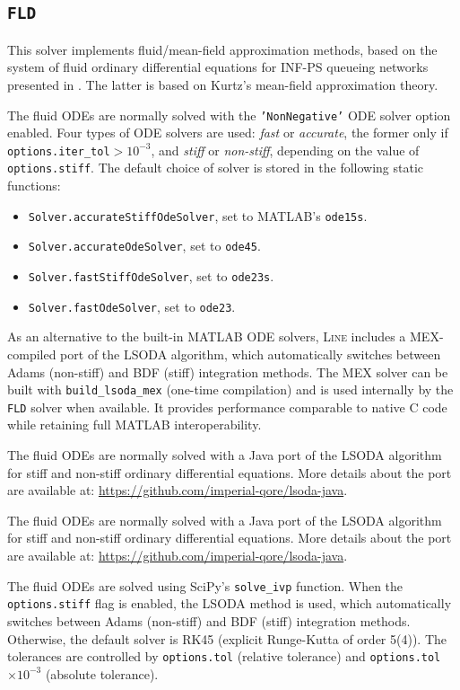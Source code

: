\subsection{\texttt{FLD}}
This solver implements fluid/mean-field approximation methods, based on the system of fluid ordinary differential equations for INF-PS queueing networks presented in \cite{PerC17}. The latter is based on Kurtz's mean-field approximation theory.
\begin{MATLAB}
The fluid ODEs are normally solved with the \texttt{'NonNegative'} ODE solver option enabled. Four types of ODE solvers are used: \emph{fast} or \emph{accurate}, the former only if \texttt{options.iter\_tol}$> 10^{-3}$, and \emph{stiff} or \emph{non-stiff}, depending on the value of \texttt{options.stiff}. The default choice of solver is stored in the following static functions:
\begin{itemize}
\item \texttt{Solver.accurateStiffOdeSolver}, set to MATLAB's \texttt{ode15s}.
\item \texttt{Solver.accurateOdeSolver}, set to \texttt{ode45}.
\item \texttt{Solver.fastStiffOdeSolver}, set to \texttt{ode23s}.
\item \texttt{Solver.fastOdeSolver}, set to \texttt{ode23}.
\end{itemize}
As an alternative to the built-in MATLAB ODE solvers, \textsc{Line} includes a MEX-compiled port of the LSODA algorithm, which automatically switches between Adams (non-stiff) and BDF (stiff) integration methods.  The MEX solver can be built with \texttt{build\_lsoda\_mex} (one-time compilation) and is used internally by the \texttt{FLD} solver when available.  It provides performance comparable to native C code while retaining full MATLAB interoperability.
\end{MATLAB}
\begin{JAVA}
The fluid ODEs are normally solved with a Java port of the LSODA algorithm for stiff and non-stiff ordinary differential equations. More details about the port are available at: \url{https://github.com/imperial-qore/lsoda-java}.
\end{JAVA}
\begin{KOTLIN}
The fluid ODEs are normally solved with a Java port of the LSODA algorithm for stiff and non-stiff ordinary differential equations. More details about the port are available at: \url{https://github.com/imperial-qore/lsoda-java}.
\end{KOTLIN}
\begin{PYTHON}
The fluid ODEs are solved using SciPy's \texttt{solve\_ivp} function. When the \texttt{options.stiff} flag is enabled, the LSODA method is used, which automatically switches between Adams (non-stiff) and BDF (stiff) integration methods. Otherwise, the default solver is RK45 (explicit Runge-Kutta of order 5(4)). The tolerances are controlled by \texttt{options.tol} (relative tolerance) and \texttt{options.tol}$\times 10^{-3}$ (absolute tolerance).
\end{PYTHON}

